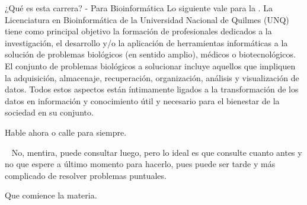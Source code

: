 
\begin{frame}{¿Qué es esta carrera? - Para Bioinformática}
  \small{
  Lo siguiente vale para la .
  \jump
  La Licenciatura en Bioinformática de la Universidad Nacional de Quilmes (UNQ)
  tiene como principal objetivo la formación de profesionales dedicados a la
  investigación, el desarrollo y/o la aplicación de herramientas informáticas a
  la solución de problemas biológicos (en sentido amplio), médicos o
  biotecnológicos. El conjunto de problemas biológicos a solucionar incluye
  aquellos que impliquen la adquisición, almacenaje, recuperación, organización,
  análisis y visualización de datos. Todos estos aspectos están íntimamente
  ligados a la transformación de los datos en información y conocimiento útil
  y necesario para el bienestar de la sociedad en su conjunto.
  }
\end{frame}






\begin{frame}[plain]
	\centerline{}
  \centerline{Hable ahora o calle para siempre.}
  ~\jump
  \small{No, mentira, puede consultar luego, pero lo ideal es que
    consulte cuanto antes y no que espere a último momento para hacerlo, pues
    puede ser tarde y más complicado de resolver problemas puntuales.}
\end{frame}


\begin{frame}[plain]
  \centerline{Que comience la materia.}
\end{frame}

